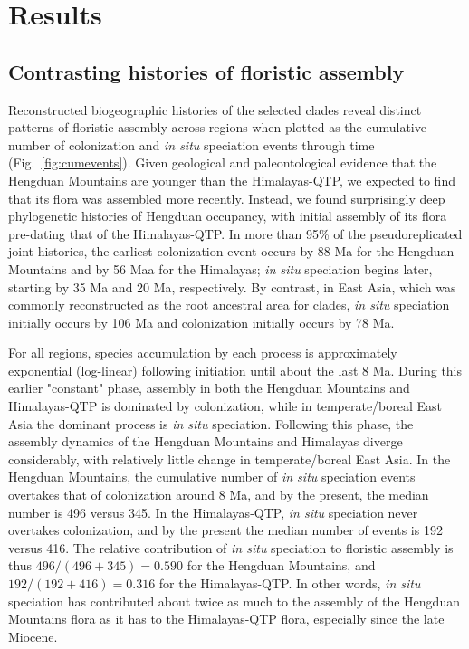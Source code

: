 \section{Results}

\subsection{Contrasting histories of floristic assembly}

Reconstructed biogeographic histories of the selected clades reveal distinct patterns of floristic assembly across regions when plotted as the cumulative number of colonization and \textit{in situ} speciation events through time (Fig.~\ref{fig:cumevents}). Given geological and paleontological evidence that the Hengduan Mountains are younger than the Himalayas-QTP, we expected to find that its flora was assembled more recently. Instead, we found surprisingly deep phylogenetic histories of Hengduan occupancy, with initial assembly of its flora pre-dating that of the Himalayas-QTP. In more than 95\% of the pseudoreplicated joint histories, the earliest colonization event occurs by 88 Ma for the Hengduan Mountains and by 56 Maa for the Himalayas; \textit{in situ} speciation begins later, starting by 35 Ma and 20 Ma, respectively. By contrast, in East Asia, which was commonly reconstructed as the root ancestral area for clades, \textit{in situ} speciation initially occurs by 106 Ma and colonization initially occurs by 78 Ma.

For all regions, species accumulation by each process is approximately exponential (log-linear) following initiation until about the last 8 Ma. During this earlier "constant" phase, assembly in both the Hengduan Mountains and Himalayas-QTP is dominated by colonization, while in temperate/boreal East Asia the dominant process is \textit{in situ} speciation. Following this phase, the assembly dynamics of the Hengduan Mountains and Himalayas diverge considerably, with relatively little change in temperate/boreal East Asia. In the Hengduan Mountains, the cumulative number of \textit{in situ} speciation events overtakes that of colonization around 8 Ma, and by the present, the median number is 496 versus 345. In the Himalayas-QTP, \textit{in situ} speciation never overtakes colonization, and by the present the median number of events is 192 versus 416. The relative contribution of \textit{in situ} speciation to floristic assembly is thus $496/(496+345) = 0.590$ for the Hengduan Mountains, and $192/(192+416) = 0.316$ for the Himalayas-QTP. In other words, \textit{in situ} speciation has contributed about twice as much to the assembly of the Hengduan Mountains flora as it has to the Himalayas-QTP flora, especially since the late Miocene.

